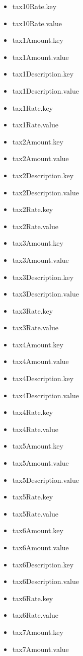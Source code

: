 \begin{multicols}{2}
\begin{itemize}
		\item[] tax10Rate.key
		\item[] tax10Rate.value
		\item[] tax1Amount.key
		\item[] tax1Amount.value
		\item[] tax1Description.key
		\item[] tax1Description.value
		\item[] tax1Rate.key
		\item[] tax1Rate.value
		\item[] tax2Amount.key
		\item[] tax2Amount.value
		\item[] tax2Description.key
		\item[] tax2Description.value
		\item[] tax2Rate.key
		\item[] tax2Rate.value
		\item[] tax3Amount.key
		\item[] tax3Amount.value
		\item[] tax3Description.key
		\item[] tax3Description.value
		\item[] tax3Rate.key
		\item[] tax3Rate.value
		\item[] tax4Amount.key
		\item[] tax4Amount.value
		\item[] tax4Description.key
		\item[] tax4Description.value
		\item[] tax4Rate.key
		\item[] tax4Rate.value
		\item[] tax5Amount.key
		\item[] tax5Amount.value
		\item[] tax5Description.value
		\item[] tax5Rate.key
		\item[] tax5Rate.value
		\item[] tax6Amount.key
		\item[] tax6Amount.value
		\item[] tax6Description.key
		\item[] tax6Description.value
		\item[] tax6Rate.key
		\item[] tax6Rate.value
		\item[] tax7Amount.key
		\item[] tax7Amount.value

\end{itemize}
\end{multicols}
